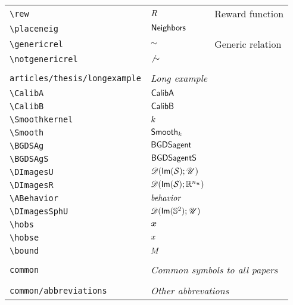 \begin{longtable}{lll}
 {\color[rgb]{0.5,0.5,0.5}\texttt{\textbackslash rew}} & $R$ &  Reward function\\ 
 {\color[rgb]{0.5,0.5,0.5}\texttt{\textbackslash placeneig}} & $\mathsf{Neighbors}$ & \\ 
 {\color[rgb]{0.5,0.5,0.5}\texttt{\textbackslash genericrel}} & $\sim$ &  Generic relation\\ 
 {\color[rgb]{0.5,0.5,0.5}\texttt{\textbackslash notgenericrel}} & $\not{\sim}$ & \\ 
  &  & \\ 
 {\color[rgb]{0.5,0.5,0.5}\texttt{articles/thesis/longexample}} & \multicolumn{2}{l}{\emph{Long example}}\\ 
 \hline
{\color[rgb]{0.5,0.5,0.5}\texttt{\textbackslash CalibA}} & $\textsf{{CalibA}}$ & \\ 
 {\color[rgb]{0.5,0.5,0.5}\texttt{\textbackslash CalibB}} & $\textsf{{CalibB}}$ & \\ 
 {\color[rgb]{0.5,0.5,0.5}\texttt{\textbackslash Smoothkernel}} & $k$ & \\ 
 {\color[rgb]{0.5,0.5,0.5}\texttt{\textbackslash Smooth}} & $\textsf{{Smooth}}_{k}$ & \\ 
 {\color[rgb]{0.5,0.5,0.5}\texttt{\textbackslash BGDSAg}} & $\textsf{{BGDSagent}}$ & \\ 
 {\color[rgb]{0.5,0.5,0.5}\texttt{\textbackslash BGDSAgS}} & $\textsf{{BGDSagentS}}$ & \\ 
 {\color[rgb]{0.5,0.5,0.5}\texttt{\textbackslash DImagesU}} & $\DImagesU$ & \\ 
 {\color[rgb]{0.5,0.5,0.5}\texttt{\textbackslash DImagesR}} & $\DImagesR$ & \\ 
 {\color[rgb]{0.5,0.5,0.5}\texttt{\textbackslash ABehavior}} & $\textit{behavior}$ & \\ 
 {\color[rgb]{0.5,0.5,0.5}\texttt{\textbackslash DImagesSphU}} & $\mathscr{D}(\mathsf{Im}(\mathbb{S}^2);\mathscr{U})$ & \\ 
 {\color[rgb]{0.5,0.5,0.5}\texttt{\textbackslash hobs}} & $\boldsymbol{x}$ & \\ 
 {\color[rgb]{0.5,0.5,0.5}\texttt{\textbackslash hobse}} & $x$ & \\ 
 {\color[rgb]{0.5,0.5,0.5}\texttt{\textbackslash bound}} & $M$ & \\ 
  &  & \\ 
 {\color[rgb]{0.5,0.5,0.5}\texttt{common}} & \multicolumn{2}{l}{\emph{Common symbols to all papers}}\\ 
 \hline
\hline
 &  & \\ 
 {\color[rgb]{0.5,0.5,0.5}\texttt{common/abbreviations}} & \multicolumn{2}{l}{\emph{Other abbrevations}}\\ 

\end{longtable}
